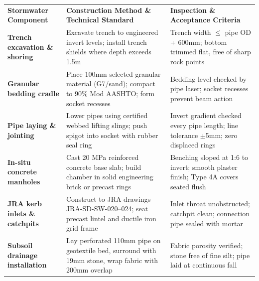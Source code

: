 {\fontsize{7.7pt}{9.8pt}\selectfont
\renewcommand{\arraystretch}{1.23}
\noindent
\begin{tabularx}{\textwidth}{@{}p{3.3cm} p{6.6cm} X@{}}
\rowcolor{mhnavy}
{\color{white}\bfseries Stormwater Component} & {\color{white}\bfseries Construction Method \& Technical Standard} & {\color{white}\bfseries Inspection \& Acceptance Criteria} \\
\rowcolor{mhbluelight}
\bfseries Trench excavation \& shoring & Excavate trench to engineered invert levels; install trench shields where depth exceeds 1.5m & Trench width $\le$ pipe OD + 600mm; bottom trimmed flat, free of sharp rock points \\
\bfseries Granular bedding cradle & Place 100mm selected granular material (G7/sand); compact to 90\% Mod AASHTO; form socket recesses & Bedding level checked by pipe laser; socket recesses prevent beam action \\
\rowcolor{mhbluelight}
\bfseries Pipe laying \& jointing & Lower pipes using certified webbed lifting slings; push spigot into socket with rubber seal ring & Invert gradient checked every pipe length; line tolerance $\pm$5mm; zero displaced rings \\
\bfseries In-situ concrete manholes & Cast 20 MPa reinforced concrete base slab; build chamber in solid engineering brick or precast rings & Benching sloped at 1:6 to invert; smooth plaster finish; Type 4A covers seated flush \\
\rowcolor{mhbluelight}
\bfseries JRA kerb inlets \& catchpits & Construct to JRA drawings JRA-SD-SW-020--024; seat precast lintel and ductile iron grid frame & Inlet throat unobstructed; catchpit clean; connection pipe sealed with mortar \\
\bfseries Subsoil drainage installation & Lay perforated 110mm pipe on geotextile bed, surround with 19mm stone, wrap fabric with 200mm overlap & Fabric porosity verified; stone free of fine silt; pipe laid at continuous fall \\
\end{tabularx}
\renewcommand{\arraystretch}{1}
}

\vfill

